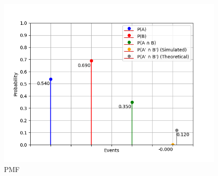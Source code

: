 \documentclass[journal]{IEEEtran}
\begin{document}
\begin{figure}[h!]
   \centering
   \includegraphics[width=1\columnwidth]{figure/fig.png}
   \caption{PMF}
   \label{stemplot}
\end{figure}
\end{document}
